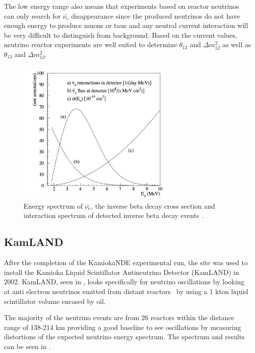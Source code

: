 The low energy range also means that experiments based on reactor neutrinos can only search for $\bar{\nu_e}$ disappearance since the produced neutrinos do not have enough energy to produce muons or taus and any neutral current interaction will be very difficult to distinguish from background. Based on the current values, neutrino reactor experiments are well suited to determine $\theta_{12}$ and $\Delta m_{12}^2 $ as well as  $\theta_{13}$ and $\Delta m_{13}^2$.

\begin{figure}[h!]
\centering
  \centering
\includegraphics[width=0.7\textwidth]{figures/reactor.jpeg}
\vspace{2mm}
\caption{Energy spectrum of $\bar{\nu_e}$, the inverse beta decay cross section and interaction spectrum of detected inverse beta decay events~\cite{65Reactor}.}
\label{fig:reactor}
\end{figure}

\subsection{KamLAND}
After the completion of the KamiokaNDE experimental run, the site was used to install the Kamioka Liquid Scintillator Antineutrino Detector (KamLAND) in 2002. KamLAND, seen in , looks specifically for neutrino oscillations by looking at anti electron neutrinos emitted from distant reactors~\cite{46KamLAND} by using a 1 kton liquid scintillator volume encased by oil. %

The majority of the neutrino events are from 26 reactors within the distance range of 138-214 km providing a good baseline to see oscillations by measuring distortions of the expected neutrino energy spectrum. The spectrum and results can be seen in . 


